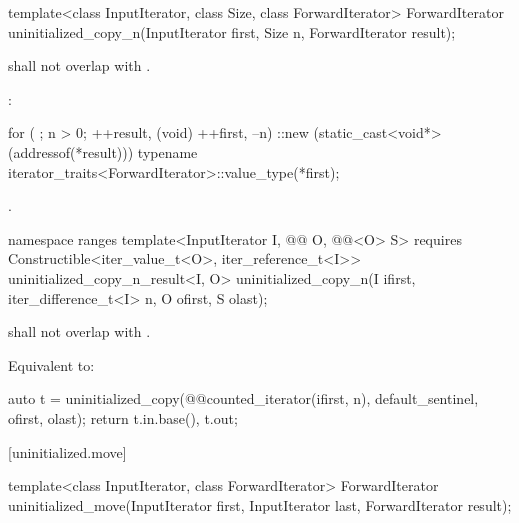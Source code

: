 %
\begin{itemdecl}
template<class InputIterator, class Size, class ForwardIterator>
  ForwardIterator uninitialized_copy_n(InputIterator first, Size n, ForwardIterator result);
\end{itemdecl}

\begin{itemdescr}
\begin{addedblock}
\pnum
\expects
{} shall not overlap with .
\end{addedblock}

\pnum
\effects
{}:
\begin{codeblock}
for ( ; n > 0; ++result, (void) ++first, --n) {
  ::new (static_cast<void*>(addressof(*result)))
    typename iterator_traits<ForwardIterator>::value_type(*first);
}
\end{codeblock}

\pnum
\returns {}.
\end{itemdescr}

\begin{addedblock}
%
\begin{itemdecl}
namespace ranges {
  template<InputIterator I, @@ O, @@<O> S>
      requires Constructible<iter_value_t<O>, iter_reference_t<I>>
    uninitialized_copy_n_result<I, O>
      uninitialized_copy_n(I ifirst, iter_difference_t<I> n, O ofirst, S olast);
}
\end{itemdecl}

\begin{itemdescr}
\pnum
\expects
{} shall not overlap with
.

\pnum
\effects Equivalent to:
\begin{codeblock}
auto t = uninitialized_copy(@@counted_iterator(ifirst, n),
                            default_sentinel{}, ofirst, olast);
return {t.in.base(), t.out};
\end{codeblock}
\end{itemdescr}
\end{addedblock}

[uninitialized.move]{}

%
\begin{itemdecl}
template<class InputIterator, class ForwardIterator>
  ForwardIterator uninitialized_move(InputIterator first, InputIterator last,
                                     ForwardIterator result);
\end{itemdecl}

